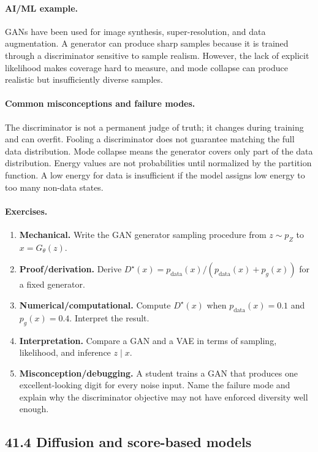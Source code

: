 \paragraph{AI/ML example.}
GANs have been used for image synthesis, super-resolution, and data augmentation. A generator can produce sharp samples because it is trained through a discriminator sensitive to sample realism. However, the lack of explicit likelihood makes coverage hard to measure, and mode collapse can produce realistic but insufficiently diverse samples.

\paragraph{Common misconceptions and failure modes.}
The discriminator is not a permanent judge of truth; it changes during training and can overfit. Fooling a discriminator does not guarantee matching the full data distribution. Mode collapse means the generator covers only part of the data distribution. Energy values are not probabilities until normalized by the partition function. A low energy for data is insufficient if the model assigns low energy to too many non-data states.

\paragraph{Exercises.}
\begin{enumerate}[label=\textbf{41.3.\arabic*.}, leftmargin=*]
\item \textbf{Mechanical.} Write the GAN generator sampling procedure from \(z\sim p_Z\) to \(x=G_\theta(z)\).
\item \textbf{Proof/derivation.} Derive \(D^\star(x)=p_{\mathrm{data}}(x)/(p_{\mathrm{data}}(x)+p_g(x))\) for a fixed generator.
\item \textbf{Numerical/computational.} Compute \(D^\star(x)\) when \(p_{\mathrm{data}}(x)=0.1\) and \(p_g(x)=0.4\). Interpret the result.
\item \textbf{Interpretation.} Compare a GAN and a VAE in terms of sampling, likelihood, and inference \(z\mid x\).
\item \textbf{Misconception/debugging.} A student trains a GAN that produces one excellent-looking digit for every noise input. Name the failure mode and explain why the discriminator objective may not have enforced diversity well enough.
\end{enumerate}

\subsection{41.4 Diffusion and score-based models}

